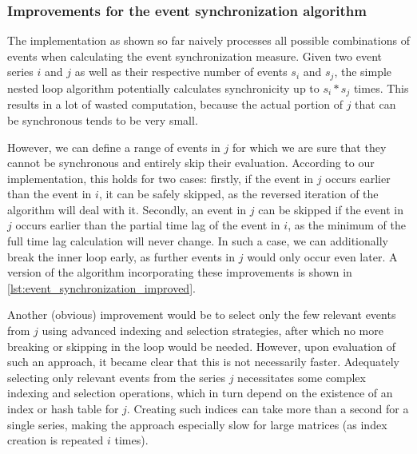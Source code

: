 \subsubsection{Improvements for the event synchronization algorithm}
The implementation as shown so far naively processes all possible combinations of events when calculating the event synchronization measure. Given two event series $i$ and $j$ as well as their respective number of events $s_i$ and $s_j$, the simple nested loop algorithm potentially calculates synchronicity up to $s_i * s_j$ times. This results in a lot of wasted computation, because the actual portion of $j$ that can be synchronous tends to be very small.

However, we can define a range of events in $j$ for which we are sure that they cannot be synchronous and entirely skip their evaluation. According to our implementation, this holds for two cases: firstly, if the event in $j$ occurs earlier than the event in $i$, it can be safely skipped, as the reversed iteration of the algorithm will deal with it. Secondly, an event in $j$ can be skipped if the event in $j$ occurs earlier than the partial time lag of the event in $i$, as the minimum of the full time lag calculation will never change. In such a case, we can additionally break the inner loop early, as further events in $j$ would only occur even later. A version of the algorithm incorporating these improvements is shown in \cref{lst:event_synchronization_improved}.

Another (obvious) improvement would be to select only the few relevant events from $j$ using advanced indexing and selection strategies, after which no more breaking or skipping in the loop would be needed. However, upon evaluation of such an approach, it became clear that this is not necessarily faster. Adequately selecting only relevant events from the series $j$ necessitates some complex indexing and selection operations, which in turn depend on the existence of an index or hash table for $j$. Creating such indices can take more than a second for a single series, making the approach especially slow for large matrices (as index creation is repeated $i$ times).


